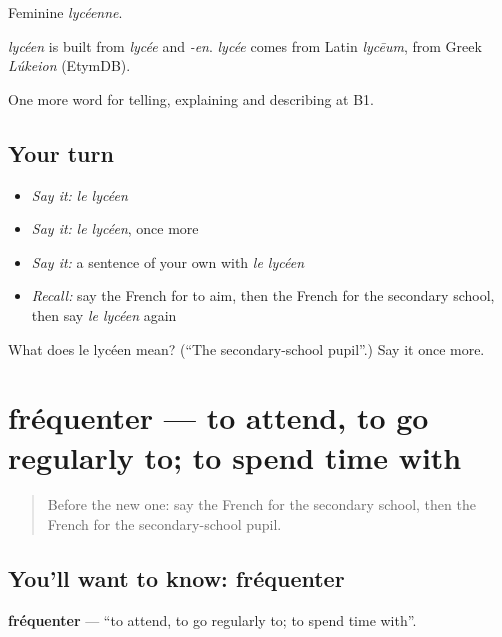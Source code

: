 Feminine \emph{lycéenne}.

\begin{cousinweb}
\emph{lycéen} is built from \emph{lycée} and \emph{-en}. \emph{lycée} comes from Latin \emph{lycēum}, from Greek \emph{Lúkeion} (EtymDB).
\end{cousinweb}

\begin{grammarlens}[title={What you've built}]
One more word for telling, explaining and describing at B1.
\end{grammarlens}

\subsection*{Your turn}
\begin{itemize}
\raggedright
  \item \emph{Say it:} \emph{le lycéen}
  \item \emph{Say it:} \emph{le lycéen}, once more
  \item \emph{Say it:} a sentence of your own with \emph{le lycéen}
  \item \emph{Recall:} say the French for to aim, then the French for the secondary school, then say \emph{le lycéen} again
\end{itemize}

\begin{tcolorbox}[breakable,colback=teal!4,colframe=teal!35!black,title={Before you move on}]
What does le lycéen mean? (\textquotedblleft{}The secondary-school pupil\textquotedblright{}.) Say it once more.
\end{tcolorbox}
\section[fréquenter]{fréquenter — to attend, to go regularly to; to spend time with}

\label{lesson:FR-C375-frequenter}



\begin{quote}
Before the new one: say the French for the secondary school, then the French for the secondary-school pupil.
\end{quote}

\subsection*{You'll want to know: fréquenter}
\textbf{fréquenter} — \textquotedblleft{}to attend, to go regularly to; to spend time with\textquotedblright{}.


